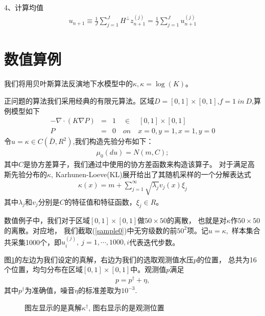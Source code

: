 \documentclass[a4paper,12pt,oneside,CJK]{cctbook}
\theoremstyle{definition}
\numberwithin{equation}{section}
\begin{document}
4、计算均值
\begin{eqnarray*}
   u_{n+1}\equiv \frac{1}{J}\sum_{j=1}^J H^{\perp} z_{n+1}^{(j)}=\frac{1}{J}\sum_{j=1}^J u_{n+1}^{(j)}
\end{eqnarray*}

\section{数值算例}

我们将用贝叶斯算法反演地下水模型中的$\kappa ,\kappa=\log(K)$。

正问题的算法我们采用经典的有限元算法。区域$D=[0,1]\times[0,1]$,$f=1~in~D$,算例模型如下
\begin{eqnarray*}
    -\nabla\cdot(K\nabla P)&=&1 \quad \in\quad [0,1]\times [0,1]\\
     P&=&0\quad on \quad x=0,y=1,x=1,y=0
\end{eqnarray*}
令$u=\kappa\in C(\bar{D},R^2)$,我们构造先验分布如下：
\begin{eqnarray}
    \mu_0(du)= N(m,C);
\end{eqnarray}
其中$C$是协方差算子，我们通过\cite{DAN}中使用的协方差函数来构造该算子。
对于满足高斯先验分布的$\kappa$, Karhunen-Loeve(KL)展开给出了其随机采样的一个分解表达式
\begin{eqnarray}\label{sample0}
    \kappa(x)=m+\sum_{j=1}^{\infty}\sqrt{\lambda_j}v_j(x)\xi_j
\end{eqnarray}
其中$\lambda_j$和$v_j$分别是$C$的特征值和特征函数，$\xi_j\in R$。

数值例子中，我们对于区域$[0,1]\times[0,1]$做$50\times 50$的离散，
也就是对$\kappa$作$50\times 50$的离散。对应地，
我们截取(\ref{sample0})中无穷级数的前$50^2$项。记$u=\kappa,$
样本集合共采集1000个，即$u_i^{(j)},~j=1,\cdots,1000,i$代表迭代步数。

图\ref{fig5}的左边为我们设定的真解，右边为我们的选取观测值水压$p$的位置，
总共为16个位置，均匀分布在区域$[0,1]\times[0,1]$中。观测值$p$满足
\begin{eqnarray}
    p=p^{\dagger}+\eta,
\end{eqnarray}
其中$p^{\dagger}$为准确值，噪音$\eta$的标准差取为$10^{-3}$.

\begin{figure}
\caption{图左显示的是真解$\kappa^{\dagger}$,
图右显示的是观测位置}\label{fig5}
\end{figure}
\end{document}
